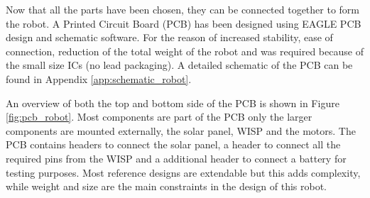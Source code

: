 Now that all the parts have been chosen, they can be connected together to form the robot.
A Printed Circuit Board (PCB) has been designed using EAGLE PCB design and schematic software.
For the reason of increased stability, ease of connection, reduction of the total weight of the robot and was required because of the small size ICs (no lead packaging).
A detailed schematic of the PCB can be found in Appendix \ref{app:schematic_robot}.

An overview of both the top and bottom side of the PCB is shown in Figure \ref{fig:pcb_robot}.
Most components are part of the PCB only the larger components are mounted externally, the solar panel, WISP and the motors.
The PCB contains headers to connect the solar panel, a header to connect all the required pins from the WISP and a additional header to connect a battery for testing purposes.
Most reference designs are extendable but this adds complexity, while weight and size are the main constraints in the design of this robot.


